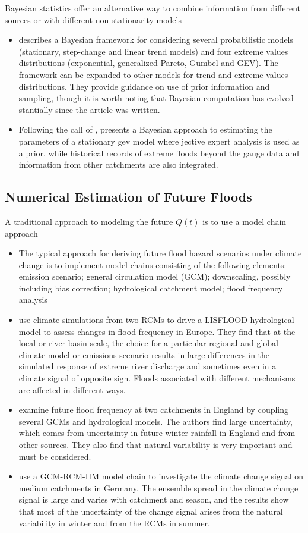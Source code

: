 \documentclass[11pt]{article}
\begin{document}
Bayesian statistics offer an alternative way to combine information from different sources or with different non-stationarity models
\begin{itemize}
  \item \citet{Renard2006} describes a Bayesian framework for considering several probabilistic models (stationary, step-change and linear trend models) and four extreme values distributions (exponential, generalized Pareto, Gumbel and GEV). The framework can be expanded to other models for trend and extreme values distributions. They provide guidance on use of prior information and sampling, though it is worth noting that Bayesian computation has evolved stantially since the article was written.
  \item Following the call of \citet{Merz2008,Merz2008a}, \citep{Viglione2013} presents a Bayesian approach to estimating the parameters of a stationary {gev} model where jective expert analysis is used as a prior, while historical records of extreme floods beyond the gauge data and information from other catchments are also integrated.
\end{itemize}

\subsection{Numerical Estimation of Future Floods}

A traditional approach to modeling the future $Q(t)$ is to use a model chain approach
\begin{itemize}
  \item The typical approach for deriving future flood hazard scenarios under climate change is to implement model chains consisting of the following elements: emission scenario; general circulation model (GCM); downscaling, possibly including bias correction; hydrological catchment model; flood frequency analysis \citep{Merz2014}
  \item \citet{Dankers2009} use climate simulations from two RCMs to drive a LISFLOOD hydrological model to assess changes in flood frequency in Europe. They find that at the local or river basin scale, the choice for a particular regional and global climate model or emissions scenario results in large differences in the simulated response of extreme river discharge and sometimes even in a climate signal of opposite sign. Floods associated with different mechanisms are affected in different ways.
  \item \citet{Kay2008} examine future flood frequency at two catchments in England by coupling several GCMs and hydrological models. The authors find large uncertainty, which comes from uncertainty in future winter rainfall in England and from other sources. They also find that natural variability is very important and must be considered.
  \item\citet{Ott2013} use a GCM-RCM-HM model chain to investigate the climate change signal on medium catchments in Germany. The ensemble spread in the climate change signal is large and varies with catchment and season, and the results show that most of the uncertainty of the change signal arises from the natural variability in winter and from the RCMs in summer.
\end{itemize}
\end{document}
